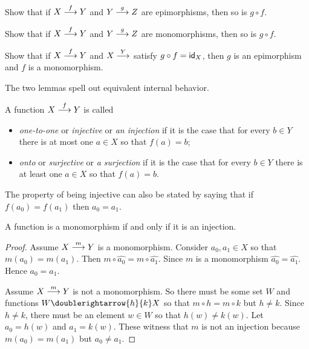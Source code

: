\begin{exercises}
	\begin{firstexercise}
		\item Show that if $\sfromto fXY$ and $\sfromto gYZ$ are epimorphisms, then so is $g\circ f$. 
		\item Show that if $\sfromto fXY$ and $\sfromto gYZ$ are monomorphisms, then so is $g\circ f$.
		\item Show that if $\sfromto fXY$ and $\sfromto YX$ satisfy $g\circ f = \id_X$, then $g$ is an epimorphism and $f$ is a monomorphism.
	\end{firstexercise}
\end{exercises}

The two lemmas spell out equivalent internal behavior.

\begin{defn}
	A function $\sfromto fXY$ is called
	\begin{itemize}
		\item \emph{one-to-one} or \emph{injective} or \emph{an injection} if it is the case that for every $b\in Y$ there is at most one $a\in X$ so that $f(a)=b$;
		\item \emph{onto} or \emph{surjective} or \emph{a surjection} if it is the case that for every $b\in Y$ there is at least one $a\in X$ so that $f(a)=b$.
	\end{itemize}
\end{defn}

The property of being injective can also be stated by saying that if $f(a_0)=f(a_1)$ then $a_0=a_1$.

\begin{lemma}
	A function is a monomorphism if and only if it is an injection.
	
	\begin{proof}
		Assume $\sfromto mXY$ is a monomorphism. Consider $a_0,a_1\in X$ so that $m(a_0)=m(a_1)$.
		Then $m\circ \hat{a_0} = m\circ \hat{a_1}$. Since $m$ is a monomorphism $\hat{a_0} = \hat{a_1}$. Hence $a_0=a_1$.
		
		Assume $\sfromto mXY$ is not a monomorphism. 
		So there must be some set $W$ and functions $W\doublerightarrow{h}{k}X$ so that $m\circ h=m\circ k$ but $h\neq k$.
		Since $h\neq k$, there must be an element $w\in W$ so that $h(w)\neq k(w)$. 
		Let $a_0=h(w)$ and $a_1=k(w)$. 
		These witness that $m$ is not an injection because $m(a_0)=m(a_1)$ but $a_0\neq a_1$.
	\end{proof}
\end{lemma}

